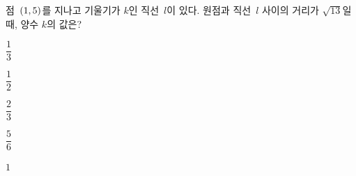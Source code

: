 점~$(1{,}\mkern3mu 5)$를 지나고 기울기가 $k$인 직선~$l$이 있다. 원점과 직선~$l$ 사이의 거리가 $\sqrt{13}$일 때, 양수 $k$의 값은?
\begin{choices32}{\rule[-3ex]{0pt}{8ex}$\dfrac{1}{3}$}{\rule[-3ex]{0pt}{8ex}$\dfrac{1}{2}$}{\rule[-3ex]{0pt}{8ex}$\dfrac{2}{3}$}{\rule[-3ex]{0pt}{8ex}$\dfrac{5}{6}$}{\rule[-3ex]{0pt}{8ex}$1$}\end{choices32}
